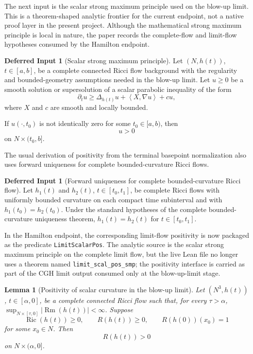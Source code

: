 \documentclass[11pt]{article}
\theoremstyle{plain}
\newtheorem{lemma}[theorem]{Lemma}
\theoremstyle{definition}
\newtheorem{deferred}[theorem]{Deferred Input}
\theoremstyle{remark}
\newcommand{\Ric}{\operatorname{Ric}}
\newcommand{\Rm}{\operatorname{Rm}}
\newcommand{\ip}[2]{\left\langle #1,#2\right\rangle}
\newcommand{\norm}[1]{\left|#1\right|}
\newcommand{\leanref}[1]{\nolinkurl{#1}}
\begin{document}
The next input is the scalar strong maximum principle used on the blow-up
limit.  This is a theorem-shaped analytic frontier for the current endpoint,
not a native proof layer in the present project.  Although the mathematical
strong maximum principle is local in nature, the paper records the
complete-flow and limit-flow hypotheses consumed by the Hamilton endpoint.
\begin{deferred}[Scalar strong maximum principle]
\label{bb:scalar-strong-mp}
Let $(N,h(t))$, $t\in[a,b]$, be a complete connected Ricci flow background
with the regularity and bounded-geometry assumptions needed in the blow-up
limit. Let $u\ge0$ be a smooth solution or supersolution of a scalar parabolic
inequality of the form
\[
\partial_tu\ge \Delta_{h(t)}u+\ip{X}{\nabla u}+cu,
\]
where $X$ and $c$ are smooth and locally bounded.

If $u(\cdot,t_0)$ is not identically zero for some $t_0\in[a,b)$, then
\[
u>0
\]
on $N\times(t_0,b]$.
\end{deferred}

The usual derivation of positivity from the terminal basepoint normalization
also uses forward uniqueness for complete bounded-curvature Ricci flows.

\begin{deferred}[Forward uniqueness for complete bounded-curvature Ricci flow]
\label{bb:complete-rf-uniqueness}
Let $h_1(t)$ and $h_2(t)$, $t\in[t_0,t_1]$, be complete Ricci flows
with uniformly bounded curvature on each compact time subinterval and with
$h_1(t_0)=h_2(t_0)$.  Under the standard hypotheses of the complete
bounded-curvature uniqueness theorem, $h_1(t)=h_2(t)$ for
$t\in[t_0,t_1]$.
\end{deferred}

In the Hamilton endpoint, the corresponding limit-flow positivity is now
packaged as the predicate \leanref{LimitScalarPos}.  The analytic source is the
scalar strong maximum principle on the complete limit flow, but the live Lean
file no longer uses a theorem named \texttt{limit\_scal\_pos\_smp}; the positivity
interface is carried as part of the CGH limit output consumed only at the
blow-up-limit stage.

\begin{lemma}[Positivity of scalar curvature in the blow-up limit]
\label{lem:limit-scalar-positive}
Let $(N^3,h(t))$, $t\in[\alpha,0]$, be a complete connected Ricci flow such
that, for every $\tau>\alpha$,
$\sup_{N\times[\tau,0]}\norm{\Rm(h(t))}<\infty$.  Suppose
\[
\Ric(h(t))\ge0,
\qquad
R(h(t))\ge0,
\qquad
R(h(0))(x_0)=1
\]
for some $x_0\in N$. Then
\[
R(h(t))>0
\]
on $N\times(\alpha,0]$.
\end{lemma}
\end{document}
